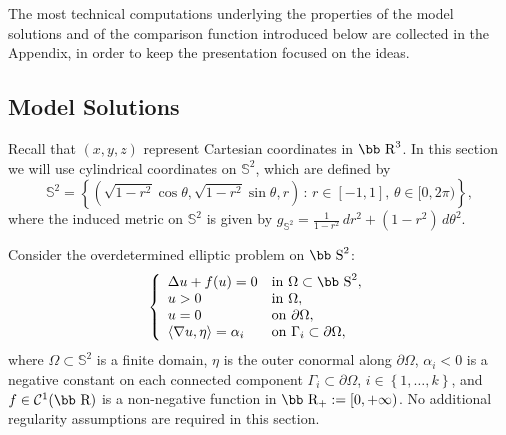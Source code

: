\documentclass[11pt]{article}
\def\r{\hbox{\bb R}}
\def\s{\hbox{\bb S}}
\newcommand{\set}[1]{\left\{#1\right\}}
\numberwithin{equation} {section}
\begin{document}
The most technical computations underlying the properties of the model solutions
and of the comparison function introduced below are collected in the Appendix,
in order to keep the presentation focused on the ideas.

\subsection{Model Solutions}\label{SectModel}
Recall that $(x,y,z)$ represent Cartesian coordinates in $\r^3$. In this section we will use cylindrical coordinates on $\mathbb{S}^2$, which are defined by
\[
\mathbb{S}^2 = \set{ \left( \sqrt{1-r^2} \cos \theta, \sqrt{1-r^2} \sin \theta, r \right) \, : \, r \in [-1,1], \, \theta \in [0,2\pi)},
\]
where the induced metric on $\mathbb{S}^2$ is given by $ g_{\mathbb{S}^2} = \frac{1}{1-r^2} \, dr^2 + (1 - r^2) \, d\theta^2$.

Consider the overdetermined elliptic problem on $\s^2$:
\begin{eqnarray} \label{OEP2}
    \left\{
    \begin{array}{llll}
        \Delta u + f(u) = 0  &\mathrm{in}~\Omega \subset \s^2,\\
        u > 0  &\mathrm{in}~\Omega, \\
        u = 0  &\mathrm{on}~\partial \Omega,\\
        \langle \nabla u, \eta \rangle = \alpha _i  &\mathrm{on}~\Gamma _i \subset \partial \Omega,
    \end{array}
    \right.
\end{eqnarray}
where \(\Omega \subset \mathbb{S}^2\) is a finite domain, $\eta$ is the outer conormal along $\partial \Omega$, \(\alpha_i < 0\) is a negative constant on each connected component $\Gamma _i \subset \partial \Omega$, $i \in \set{1,\dots ,k}$, and $f \in \mathcal{C}^1 (\r)$ is a non-negative function in $\r_+ := [0, +\infty)$. No additional regularity assumptions are required in this section. 
\end{document}
